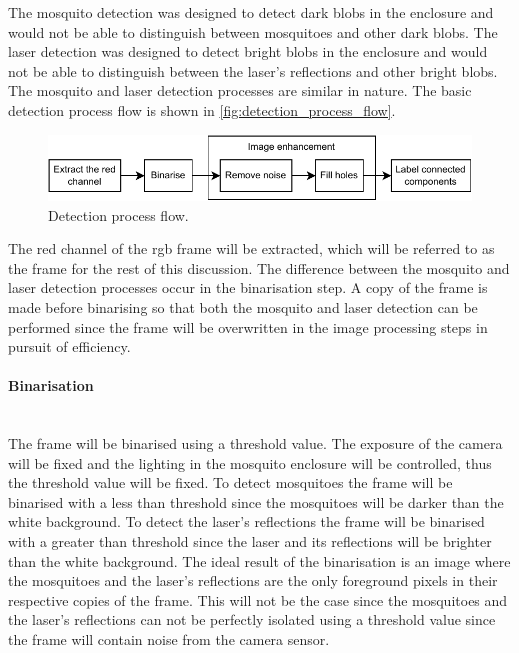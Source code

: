 The mosquito detection was designed to detect dark blobs in the enclosure and would not be able to distinguish between mosquitoes and other dark blobs. The laser detection was designed to detect bright blobs in the enclosure and would not be able to distinguish between the laser's reflections and other bright blobs. The mosquito and laser detection processes are similar in nature. The basic detection process flow is shown in \autoref{fig:detection_process_flow}.
\begin{figure}[!htb]
  \centering
  \includegraphics[width=\textwidth]{figures/detection/detection_process_flow.pdf}
  \caption{Detection process flow.}
  \label{fig:detection_process_flow}
\end{figure}
The red channel of the \gls{rgb} frame will be extracted, which will be referred to as the frame for the rest of this discussion. The difference between the mosquito and laser detection processes occur in the binarisation step. A copy of the frame is made before binarising so that both the mosquito and laser detection can be performed since the frame will be overwritten in the image processing steps in pursuit of efficiency.


\paragraph{Binarisation}\mbox{}\\
The frame will be binarised using a threshold value. The exposure of the camera will be fixed and the lighting in the mosquito enclosure will be controlled, thus the threshold value will be fixed. To detect mosquitoes the frame will be binarised with a less than threshold since the mosquitoes will be darker than the white background. To detect the laser's reflections the frame will be binarised with a greater than threshold since the laser and its reflections will be brighter than the white background. The ideal result of the binarisation is an image where the mosquitoes and the laser's reflections are the only foreground pixels in their respective copies of the frame. This will not be the case since the mosquitoes and the laser's reflections can not be perfectly isolated using a threshold value since the frame will contain noise from the camera sensor.


